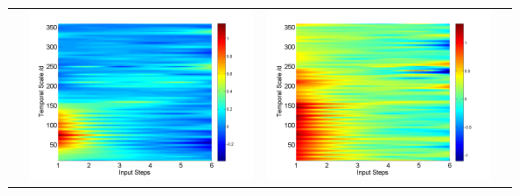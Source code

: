 \documentclass[review]{elsarticle}
\begin{document}
\begin{table}[H]
\begin{tabular}{cccc}
&\begin{minipage}{.3\textwidth}\includegraphics[width=\linewidth]{resultgraph/11532500pdiff_former.png}\end{minipage}
&\begin{minipage}{.3\textwidth}\includegraphics[width=\linewidth]{resultgraph/11532500epdiff_former.png}\end{minipage}

\end{tabular}
\end{table}
\end{document}
